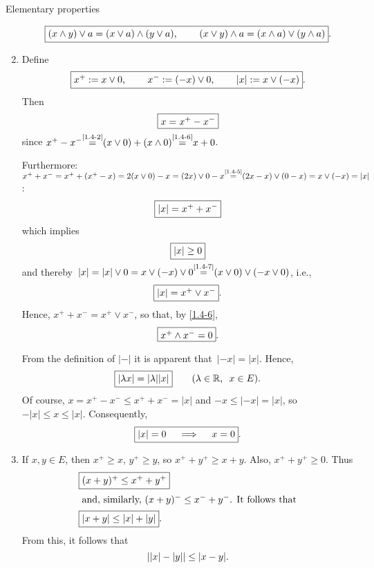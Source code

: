 \documentclass[main.tex]{subfiles}
\begin{document}
\begin{psec}{Elementary properties}
\begin{enumerate}
\begin{equation*}
\fbox{$ (x\wedge y)\vee a = (x\vee a)\wedge(y\vee a)
\textnormal{, }\qquad
(x\vee y)\wedge a = (x\wedge a)\vee (y\wedge a) $}
\textnormal{.}
\end{equation*}
\item %
\label{1.4-9}
Define
\begin{equation*}
\frmd{%
x^+ := x\vee 0\htam{, }\qquad
x^- := (-x)\vee 0\htam{, }\qquad
|x| := x\vee(-x)}
\htam{.}
\end{equation*}
Then 
\begin{equation*}
\fbox{$  x = x^+ - x^-  $}
\end{equation*}
since $x^+ - x^-
\isref{1.4-2}(x\vee 0)+(x\wedge 0) 
\isref{1.4-6}x+0$.

Furthermore:
$x^+ + x^- 
= x^+ + (x^+ - x) 
= 2(x\vee 0) -x
= (2x)\vee 0 -x
\isref{1.4-5} (2x-x)\vee(0-x) = x\vee(-x) = |x|$:
\begin{equation*}
\fbox{$ |x| = x^+ + x^- $}
\end{equation*}
which implies
\begin{equation*}
\fbox{$ |x|\ge 0 $}
\end{equation*}
and 
thereby~$|x|=|x|\vee 0
= x\vee(-x)\vee 0 \isref{1.4-7} (x\vee 0) \vee (-x\vee 0)$,
i.e., 
\begin{equation*}
\fbox{$ |x| = x^+ \vee x^- $}
\textnormal{.}
\end{equation*}
Hence, $x^+ + x^- = x^+ \vee x^-$,
so that, 
by \ref{1.4-6},
\begin{equation*}
\fbox{$ x^+ \wedge x^- = 0 $} 
\textnormal{.}
\end{equation*}

From the definition of $|-|$
it is apparent that~$|-x|=|x|$.
Hence, 
\begin{equation*}
\fbox{$ |\lambda x|=|\lambda| |x| $} 
  \qquad (\lambda\in\mathbb{R}\textnormal{, }\ x\in E)\textnormal{.}
\end{equation*}
Of course,
$x=x^+ - x^-\leq x^+ + x^- = |x|$
and $-x\leq|-x|=|x|$,
so $-|x|\leq x \leq |x|$.
Consequently,
\begin{equation*}
\fbox{$ |x|=0 \quad \implies \quad x=0 $}
\textnormal{.}
\end{equation*}
%
\item%
\label{1.4-10}
If $x,y\in E$,
then $x^+\geq x$, 
$y^+\geq y$,
so $x^+ + y^+ \geq x+y$.
Also,
$x^+ + y^+\geq 0$.
Thus
\begin{align*}
&\fbox{$ (x+y)^+ \leq x^+ + y^+ $}\\
\intertext{ and, 
similarly, 
$(x+y)^- \leq x^- + y^-$.
It follows that}
&\fbox{$ |x+y|\leq|x|+|y| $}
\textnormal{.}
\end{align*}
From this,
it follows that
\begin{equation*}
||x|-|y|| \leq |x-y| 
\textnormal{.}
\end{equation*}


\end{enumerate}
\end{psec}
\end{document}
